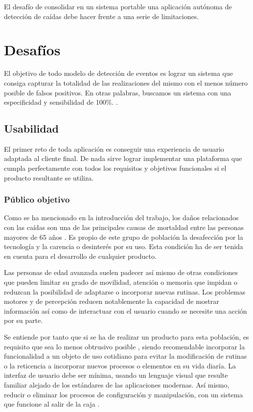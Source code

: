 El desafío de consolidar en un sistema portable una aplicación autónoma de detección de caídas debe hacer frente a una serie de limitaciones.

\section{Desafíos}

 El objetivo de todo modelo de detección de eventos es lograr un sistema que consiga capturar la totalidad de las realizaciones del mismo con el menos número posible de falsos positivos. En otras palabras, buscamos un sistema con una especificidad y sensibilidad de 100\%\cite{Noury2007}. .

\subsection{Usabilidad}
El primer reto de toda aplicación es conseguir una experiencia de usuario adaptada al cliente final. De nada sirve lograr implementar una plataforma que cumpla perfectamente con todos los requisitos y objetivos funcionales si el producto resultante se utiliza.

\subsubsection{Público objetivo}
Como se ha mencionado en la introducción del trabajo, los daños relacionados con las caídas son una de las principales causas de mortaldad entre las personas mayores de 65 años . Es propio de este grupo de población la desafección por la tecnología y la carencia o desinterés por su uso. Esta condición ha de ser tenida en cuenta para el desarrollo de cualquier producto.

Las personas de edad avanzada suelen padecer así mismo de otras condiciones que pueden limitar su grado de movilidad, atención o memoria que impidan o reduzcan la posibilidad de adaptarse o incorporar nuevas rutinas. Los problemas motores y de percepción reducen notablemente la capacidad de mostrar información así como de interactuar con el usuario cuando se necesite una acción por su parte.

Se entiende por tanto que si se ha de realizar un producto para esta población, es requisito que sea lo menos obtrusivo posible , siendo recomendable incorporar la funcionalidad a un objeto de uso cotidiano para evitar la modificación de rutinas o la reticencia a incorporar nuevos procesos o elementos en su vida diaría. La interfaz de usuario debe ser mínima, usando un lenguaje visual que resulte familiar alejado de los estándares de las aplicaciones modernas. Así mismo, reducir o eliminar los procesos de configuración y manipulación, con un sistema que funcione al salir de la caja .

